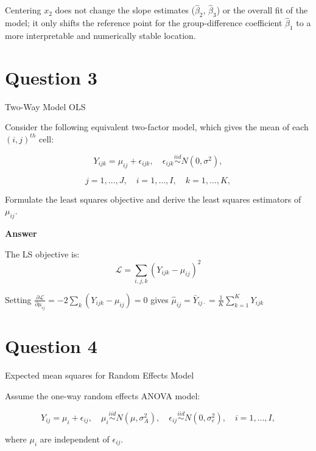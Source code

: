 \documentclass[letterpaper]{article}
\begin{document}
	Centering $x_2$ does not change the slope estimates ($\hat{\beta}_2$, $\hat{\beta}_3$) or the overall fit of the model; it only shifts the reference point for the group-difference coefficient $\hat{\beta}_1$ to a more interpretable and numerically stable location.
	
	\clearpage
	
	\section{Question 3}
	
	{\color{deepred}  Two-Way Model OLS}
	
	Consider the following equivalent two-factor model, which gives the mean of each $(i, j)^{th}$ cell:
	
	\begin{equation}
		Y_{ijk} = \mu_{ij} + \epsilon_{ijk}, \quad \epsilon_{ijk} \overset{iid}{\sim} N(0, \sigma^2),
	\end{equation}
	
	\[
	j = 1, \ldots, J, \quad i = 1, \ldots, I, \quad k = 1, \ldots, K,
	\]
	
	Formulate the least squares objective and derive the least squares estimators of $\mu_{ij}$.
	
	\textbf{Answer}
	
	The LS objective is:
	$$\mathcal{L} = \sum_{i,j,k}(Y_{ijk} - \mu_{ij})^2$$
	
	Setting $\frac{\partial \mathcal{L}}{\partial \mu_{ij}} = -2\sum_{k}(Y_{ijk} - \mu_{ij}) = 0$ gives $\hat{\mu}_{ij} = \bar{Y}_{ij\cdot} = \frac{1}{K}\sum_{k=1}^{K}Y_{ijk}$
	
	\clearpage
	
	\section{Question 4}
	
	{\color{deepred} Expected mean squares for Random Effects Model }
	
	Assume the one-way random effects ANOVA model:
	
	\begin{equation}
		Y_{ij} = \mu_i + \epsilon_{ij}, \quad \mu_i \overset{iid}{\sim} N(\mu, \sigma^2_A), \quad \epsilon_{ij} \overset{iid}{\sim} N(0, \sigma^2_e), \quad i = 1, \ldots, I,
	\end{equation}
	
	where $\mu_i$ are independent of $\epsilon_{ij}$.
	
\end{document}
